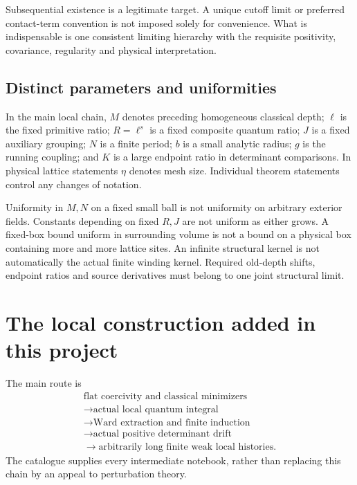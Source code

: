 Subsequential existence is a legitimate target. A unique cutoff
limit or preferred contact-term convention is not imposed
solely for convenience. What is indispensable is one consistent
limiting hierarchy with the requisite positivity, covariance,
regularity and physical interpretation.

\subsection{Distinct parameters and uniformities}

In the main local chain, \(M\) denotes preceding homogeneous
classical depth; \(\ell\) is the fixed primitive ratio;
\(R=\ell^s\) is a fixed composite quantum ratio; \(J\) is a
fixed auxiliary grouping; \(N\) is a finite period; \(b\) is
a small analytic radius; \(g\) is the running coupling; and
\(K\) is a large endpoint ratio in determinant comparisons.
In physical lattice statements \(\eta\) denotes mesh size.
Individual theorem statements control any changes of notation.

Uniformity in \(M,N\) on a fixed small ball is not uniformity on
arbitrary exterior fields. Constants depending on fixed \(R,J\)
are not uniform as either grows. A fixed-box bound uniform in
surrounding volume is not a bound on a physical box containing
more and more lattice sites. An infinite structural kernel is
not automatically the actual finite winding kernel. Required
old-depth shifts, endpoint ratios and source derivatives must
belong to one joint structural limit.

\section{The local construction added in this project}
\label{hdc-local}

The main route is
\[
 \begin{gathered}
 \text{flat coercivity and classical minimizers}\\
 \longrightarrow\text{actual local quantum integral}\\
 \longrightarrow\text{Ward extraction and finite induction}\\
 \longrightarrow\text{actual positive determinant drift}\\
 \longrightarrow\text{arbitrarily long finite weak local histories}.
 \end{gathered}
\]
The catalogue supplies every intermediate notebook, rather than
replacing this chain by an appeal to perturbation theory.

